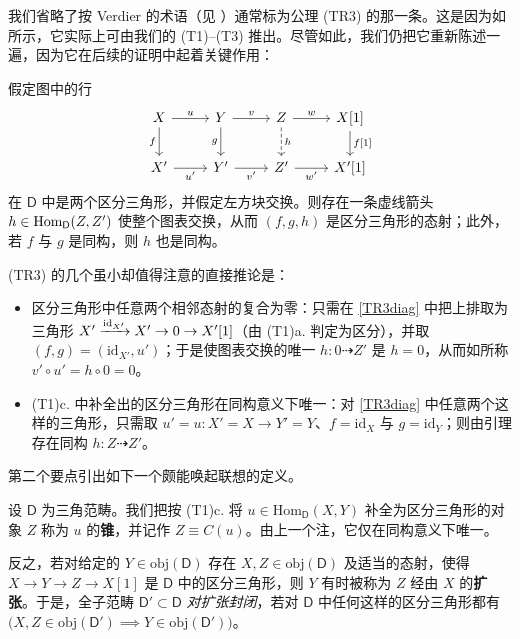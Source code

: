 我们省略了按 Verdier 的术语（见 \cite[section II.1]{[Ver96]}）通常标为公理 (TR3) 的那一条。这是因为如 \cite[Lemma 3.3]{[Imp21]} 所示，它实际上可由我们的 (T1)--(T3) 推出。尽管如此，我们仍把它重新陈述一遍，因为它在后续的证明中起着关键作用：

\begin{Lem}[TR3]\label{tr3}								%
	假定图中的行
	\begin{equation}\label{TR3diag}
		\begin{tikzcd}
			X\arrow[r,"u"]\arrow[d,"f"'] & Y \arrow[r,"v"]\arrow[d,"g"'] & Z \arrow[r,"w"]\arrow[d, dashed, "h"] & X[1]\arrow[d, "{f[1]}"] \\
			X'\arrow[r, "u'"'] & Y'\arrow[r, "v'"'] & Z'\arrow[r, "w'"'] & X'[1]
		\end{tikzcd}
	\end{equation}
	在 $\mathsf{D}$ 中是两个区分三角形，并假定左方块交换。则存在一条虚线箭头 $h\in\textup{Hom}_\mathsf{D}(Z,Z')$ 使整个图表交换，从而 $(f,g,h)$ 是区分三角形的态射；此外，若 $f$ 与 $g$ 是同构，则 $h$ 也是同构。
\end{Lem}

\begin{Rem}\label{consecindistitriang}
	(TR3) 的几个虽小却值得注意的直接推论是：
	\begin{itemize}[leftmargin=0.5cm]
		\item 区分三角形中任意两个相邻态射的复合为零：只需在 \eqref{TR3diag} 中把上排取为三角形 $X'\xrightarrow{\textup{id}_{X'}}X'\rightarrow 0\rightarrow X'[1]$（由 (T1)a. 判定为区分），并取 $(f,g)=(\text{id}_{X'},u')$；于是使图表交换的唯一 $h:0\dashrightarrow Z'$ 是 $h=0$，从而如所称 $v'\circ u'=h\circ 0=0$。
		
		\item (T1)c. 中补全出的区分三角形在同构意义下唯一：对 \eqref{TR3diag} 中任意两个这样的三角形，只需取 $u'=u: X'=X\rightarrow Y'=Y$、$f=\text{id}_X$ 与 $g=\text{id}_Y$；则由引理存在同构 $h:Z\dashrightarrow Z'$。
	\end{itemize}  
\end{Rem}

第二个要点引出如下一个颇能唤起联想的定义。

\begin{Def}\label{conesintriangulated}
	设 $\mathsf{D}$ 为三角范畴。我们把按 (T1)c. 将 $u\in\text{Hom}_\mathsf{D}(X,Y)$ 补全为区分三角形的对象 $Z$ 称为 $u$ 的\textbf{锥}，并记作 $Z\equiv C(u)$。由上一个注，它仅在同构意义下唯一。
	
	反之，若对给定的 $Y\in\text{obj}(\mathsf{D})$ 存在 $X,Z\in\text{obj}(\mathsf{D})$ 及适当的态射，使得 $X\rightarrow Y\rightarrow Z\rightarrow X[1]$ 是 $\mathsf{D}$ 中的区分三角形，则 $Y$ 有时被称为 $Z$ 经由 $X$ 的\textbf{扩张}。于是，全子范畴 $\mathsf{D}'\subset\mathsf{D}$ \textit{对扩张封闭}，若对 $\mathsf{D}$ 中任何这样的区分三角形都有 $\big(X,Z\in\text{obj}(\mathsf{D}')\implies Y\in\text{obj}(\mathsf{D}')\big)$。
\end{Def}

